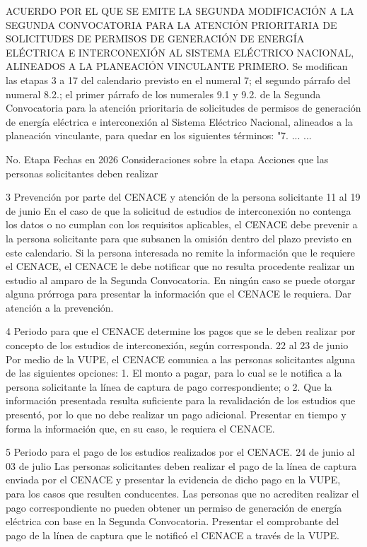 ACUERDO POR EL QUE SE EMITE LA SEGUNDA MODIFICACIÓN A LA SEGUNDA  CONVOCATORIA PARA LA ATENCIÓN PRIORITARIA DE SOLICITUDES DE PERMISOS DE GENERACIÓN DE ENERGÍA ELÉCTRICA E INTERCONEXIÓN AL SISTEMA ELÉCTRICO NACIONAL, ALINEADOS A LA PLANEACIÓN VINCULANTE
PRIMERO. Se modifican las etapas 3 a 17 del calendario previsto en el numeral 7; el segundo párrafo del numeral 8.2.; el primer párrafo de los numerales 9.1 y 9.2. de la Segunda Convocatoria para la atención prioritaria de solicitudes de permisos de generación de energía eléctrica e interconexión al Sistema Eléctrico Nacional, alineados a la planeación vinculante, para quedar en los siguientes términos:
"7. ...
...\par
No.
 Etapa
 Fechas en 2026
 Consideraciones sobre la etapa
 Acciones que las personas solicitantes deben realizar
 
 3
 Prevención por parte del CENACE y atención de la persona solicitante
 11 al 19 de junio
 En el caso de que la solicitud de estudios de interconexión no contenga los datos o no cumplan con los requisitos aplicables, el CENACE debe prevenir a la persona solicitante para que subsanen la omisión dentro del plazo previsto en este calendario.
Si la persona interesada no remite la información que le requiere el CENACE, el CENACE le debe notificar que no resulta procedente realizar un estudio al amparo de la Segunda Convocatoria.
En ningún caso se puede otorgar alguna prórroga para presentar la información que el CENACE le requiera.
 Dar atención a la prevención.
 
 4
 Periodo para que el CENACE determine los pagos que se le deben realizar por concepto de los estudios de interconexión, según corresponda.
 22 al 23 de junio
 Por medio de la VUPE, el CENACE comunica a las personas solicitantes alguna de las siguientes opciones:
1. El monto a pagar, para lo cual se le notifica a la persona solicitante la línea de captura de pago correspondiente; o
2. Que la información presentada resulta suficiente para la revalidación de los estudios que presentó, por lo que no debe realizar un pago adicional.
 Presentar en tiempo y forma la información que, en su caso, le requiera el CENACE.
 
 5
 Periodo para el pago de los estudios realizados por el CENACE.
 24 de junio al 03 de julio
 Las personas solicitantes deben realizar el pago de la línea de captura enviada por el CENACE y presentar la evidencia de dicho pago en la VUPE, para los casos que resulten conducentes. Las personas que no acrediten realizar el pago correspondiente no pueden obtener un permiso de generación de energía eléctrica con base en la Segunda Convocatoria.
 Presentar el comprobante del pago de la línea de captura que le notificó el CENACE a través de la VUPE.
 

